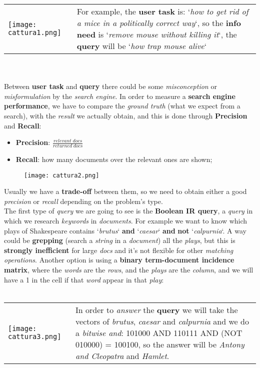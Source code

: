 \documentclass{article}
\begin{document}
\begin{tabular}{C{7cm}  L{8cm}}
        \texttt{[image: cattura1.png]} & For example, the \textbf{user task} is: `\emph{how to get rid of a mice in a politically correct way}`, so the \textbf{info need} is `\emph{remove mouse without killing it}`, the \textbf{query} will be `\emph{how trap mouse alive}`\\
\end{tabular}\\\\
Between \textbf{user task} and \textbf{query} there could be some \emph{misconception} or \emph{misformulation} by the \emph{search engine}. In order to measure a \textbf{search engine performance}, we have to compare the \emph{ground truth} (what we expect from a search), with the \emph{result} we actually obtain, and this is done through \textbf{Precision} and \textbf{Recall}:
\begin{itemize}
\item \textbf{Precision}: $\frac{relevant\;docs}{returned\;docs}$
\item \textbf{Recall}: how many documents over the relevant ones are shown;
\end{itemize}
\begin{figure}[H]
  \centering
  \texttt{[image: cattura2.png]}
\end{figure}
Usually we have a \textbf{trade-off} between them, so we need to obtain either a good \emph{precision} or \emph{recall} depending on the problem's type.\clearpage
\hfill \\ The first type of \emph{query} we are going to see is the \textbf{Boolean IR query}, a \emph{query} in which we research \emph{keywords} in \emph{documents}. For example we want to know which plays of Shakespeare contains `\emph{brutus}` \textbf{and} `\emph{caesar}` \textbf{and} \textbf{not} `\emph{calpurnia}`. A way could be \textbf{grepping} (search a \emph{string} in a \emph{document}) all the \emph{plays}, but this is \textbf{strongly inefficient} for large \emph{docs} and it's not flexible for other \emph{matching operations}. Another option is using a \textbf{binary term-document incidence matrix}, where the \emph{words} are the \emph{rows}, and the \emph{plays} are the \emph{column}, and we will have a 1 in the cell if that \emph{word} appear in that \emph{play}:\\\\
\begin{tabular}{C{8cm}  L{6.5cm}}
        \texttt{[image: cattura3.png]} & 
        In order to \emph{answer} the \textbf{query} we will take the vectors of \emph{brutus}, \emph{caesar} and \emph{calpurnia} and we do a \emph{bitwise and}: 101000 AND 110111 AND (NOT 010000) = 100100, so the answer will be \emph{Antony and Cleopatra} and \emph{Hamlet}. 
\end{tabular}\\\\
\end{document}
